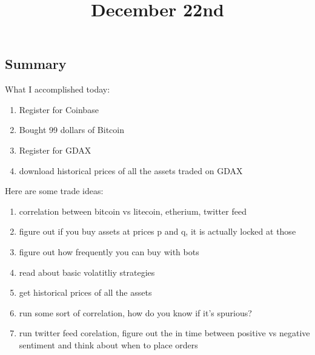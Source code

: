 \title{December 22nd}

\subsection{Summary}

What I accomplished today:

\begin{enumerate}
	\item Register for Coinbase
	\item Bought 99 dollars of Bitcoin
	\item Register for GDAX
	\item download historical prices of all the assets traded on GDAX
\end{enumerate}

Here are some trade ideas:

\begin{enumerate}
	\item correlation between bitcoin vs {litecoin, etherium, twitter feed}
	\item figure out if you buy assets at prices p and q, it is actually locked at those 
	\item figure out how frequently you can buy with bots
	\item read about basic volatitliy strategies
	\item get historical prices of all the assets
	\item run some sort of correlation, how do you know if it's spurious?
	\item run twitter feed corelation, figure out the in time between positive vs negative
	  sentiment and think about when to place orders
\end{enumerate}
